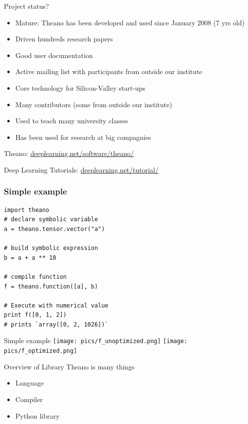 \documentclass[utf8x,xcolor=pdftex,dvipsnames,table]{beamer}
\begin{document}
\begin{frame}{Project status?}
  \begin{itemize}
    \item Mature: Theano has been developed and used since January 2008 (7 yrs old)
    \item Driven hundreds research papers
    \item Good user documentation
    \item Active mailing list with participants from outside our institute
    \item Core technology for Silicon-Valley start-ups
    \item Many contributors (some from outside our institute)
    \item Used to teach many university classes
    \item Has been used for research at big compagnies
  \end{itemize}
  Theano: \url{deeplearning.net/software/theano/}

  Deep Learning Tutorials: \url{deeplearning.net/tutorial/}
\end{frame}

\begin{frame}[fragile]
  \frametitle{Simple example}

\begin{lstlisting}
import theano
# declare symbolic variable
a = theano.tensor.vector("a")

# build symbolic expression
b = a + a ** 10

# compile function
f = theano.function([a], b)

# Execute with numerical value
print f([0, 1, 2])
# prints `array([0, 2, 1026])`
\end{lstlisting}
\end{frame}

\begin{frame}{Simple example}
\center
\texttt{[image: pics/f\_unoptimized.png]}
\hspace{0.1\textwidth}
\texttt{[image: pics/f\_optimized.png]}
\end{frame}


\begin{frame}{Overview of Library}
  Theano is many things
  \begin{itemize}
  \item Language
  \item Compiler
  \item Python library
  \end{itemize}
\end{frame}
\end{document}

